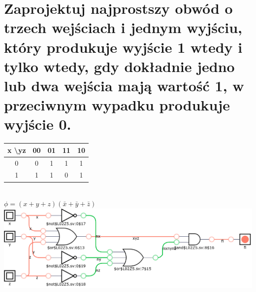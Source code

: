 \documentclass{article}
\begin{document}
\section{Zaprojektuj najprostszy obwód o trzech wejściach i jednym wyjściu, który produkuje wyjście 1 wtedy i tylko wtedy, gdy dokładnie jedno lub dwa wejścia mają wartość 1, w przeciwnym wypadku produkuje wyjście 0.}
\begin{center}
\begin{tabular}{|c|c|c|c|c|} 
	 \hline
	x \textbackslash yz& 00 & 01 & 11 & 10\\ 
	 \hline
	 0&0&1&1&1\\ \hline
	 1&1&1&0&1\\ \hline
	\end{tabular}\\
	$\phi = (x+y+z)(\bar x + \bar y + \bar z)$\\
	\includegraphics[scale=0.3]{./L02Z05.png}
\end{center}
\end{document}
